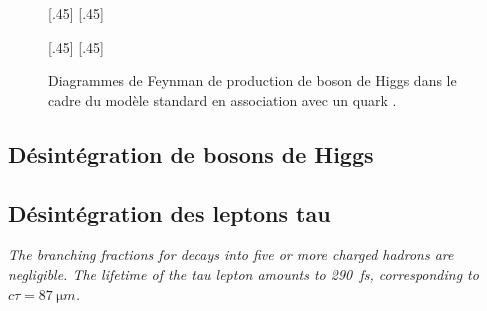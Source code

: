 \begin{figure}[h]
\centering
\vspace{\baselineskip}
\subcaptionbox{\label{subfig-fgraph-Higgs_with_b_gg_g_bbh}}[.45\textwidth]
{\vspace{\baselineskip}}
\hfill
\subcaptionbox{\label{subfig-fgraph-Higgs_with_b_qq_g_bbh}}[.45\textwidth]
{\vspace{\baselineskip}}

\vspace{2\baselineskip}
\subcaptionbox{\label{subfig-fgraph-Higgs_with_b_gg_hbb}}[.45\textwidth]
{\vspace{\baselineskip}}
\hfill
\subcaptionbox{\label{subfig-fgraph-Higgs_with_b_bg_b_bh}}[.45\textwidth]
{\vspace{\baselineskip}}

\caption[Production de boson de Higgs en association avec un quark \quarkb.]{Diagrammes de Feynman de production de boson de Higgs dans le cadre du modèle standard en association avec un quark \quarkb.}
\label{fig-fgraph-Higgs_prod_with_b}
\end{figure}










\subsection{Désintégration de bosons de Higgs}\label{chapter-MS-MSSM-section-pheno_Higgs_MSSM-subsec-desintegration_Higgs}



\subsection{Désintégration des leptons tau}\label{chapter-MS-MSSM-section-pheno_Higgs_MSSM-subsec-desintegration_lepton_tau}
\emph{The branching fractions for decays into five or more charged hadrons are negligible. The lifetime of the tau lepton amounts to \SI{290}{fs}, corresponding to $c\tau = \SI{87}{\micro m}$.}

